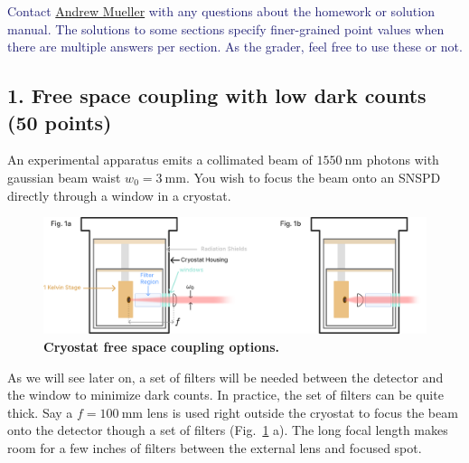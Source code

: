 \documentclass[11pt]{caltech_thesis} %
\begin{document}
\textcolor{midnightblue}{Contact \href{mailto:andrewstermueller@gmail.com}{Andrew Mueller} with any questions about the homework or solution manual. The solutions to some sections specify finer-grained point values when there are multiple answers per section. As the grader, feel free to use these or not. }

\hypertarget{free-space-coupling-with-low-dark-counts-50-points}{%
\subsection{1. Free space coupling with low dark counts (50 points)}\label{free-space-coupling-with-low-dark-counts-50-points}}

An experimental apparatus emits a collimated beam of $1550~\mathrm{nm}$ photons with gaussian beam waist $w_0 = 3~\mathrm{mm}$. You wish to focus the beam onto an SNSPD directly through a window in a cryostat.

\hypertarget{fig:cryostat_concept}{%
\begin{figure}
\centering
\includegraphics{./chapter_07/figs/fig1b_light.pdf}
\caption[{Cryostat optical coupling}]{\textbf{Cryostat free space coupling options.}}
\label{fig:cryostat_concept}
\end{figure}
}

As we will see later on, a set of filters will be needed between the detector and the window to minimize dark counts. In practice, the set of filters can be quite thick. Say a $f = 100~\mathrm{mm}$ lens is used right outside the cryostat to focus the beam onto the detector though a set of filters (Fig.~\ref{fig:cryostat_concept} a). The long focal length makes room for a few inches of filters between the external lens and focused spot.
\end{document}
